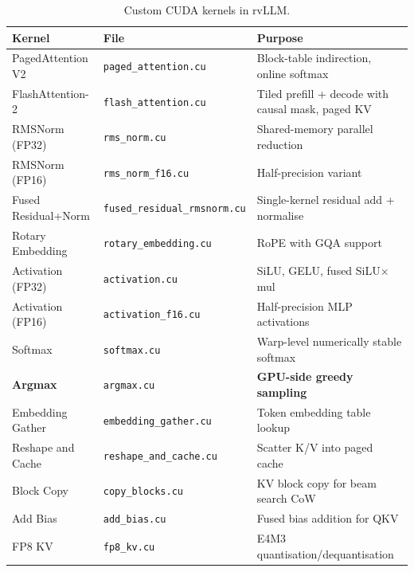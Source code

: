 \documentclass[11pt,a4paper]{article}
\newcommand{\thead}[1]{\textbf{\color{white}#1}}
\begin{document}
\begin{table}[t]
  \centering
  \caption{Custom CUDA kernels in rvLLM.}
  \label{tab:kernels}
  \small
  \begin{tabular}{@{}llp{4.8cm}@{}}
    \toprule
    \rowcolor{HeaderBlue} \thead{Kernel} & \thead{File} & \thead{Purpose} \\
    \midrule
    PagedAttention V2   & \texttt{paged\_attention.cu}         & Block-table indirection, online softmax \\
    \rowcolor{gray!8}
    FlashAttention-2    & \texttt{flash\_attention.cu}          & Tiled prefill + decode with causal mask, paged KV \\
    RMSNorm (FP32)      & \texttt{rms\_norm.cu}                & Shared-memory parallel reduction \\
    \rowcolor{gray!8}
    RMSNorm (FP16)      & \texttt{rms\_norm\_f16.cu}            & Half-precision variant \\
    Fused Residual+Norm  & \texttt{fused\_residual\_rmsnorm.cu}  & Single-kernel residual add + normalise \\
    \rowcolor{gray!8}
    Rotary Embedding     & \texttt{rotary\_embedding.cu}         & RoPE with GQA support \\
    Activation (FP32)    & \texttt{activation.cu}               & SiLU, GELU, fused SiLU$\times$mul \\
    \rowcolor{gray!8}
    Activation (FP16)    & \texttt{activation\_f16.cu}           & Half-precision MLP activations \\
    Softmax              & \texttt{softmax.cu}                  & Warp-level numerically stable softmax \\
    \rowcolor{gray!8}
    \textbf{Argmax}      & \texttt{argmax.cu}                   & \textbf{GPU-side greedy sampling} \\
    Embedding Gather     & \texttt{embedding\_gather.cu}         & Token embedding table lookup \\
    \rowcolor{gray!8}
    Reshape and Cache    & \texttt{reshape\_and\_cache.cu}       & Scatter K/V into paged cache \\
    Block Copy           & \texttt{copy\_blocks.cu}              & KV block copy for beam search CoW \\
    \rowcolor{gray!8}
    Add Bias             & \texttt{add\_bias.cu}                & Fused bias addition for QKV \\
    FP8 KV               & \texttt{fp8\_kv.cu}                  & E4M3 quantisation/dequantisation \\
    \bottomrule
  \end{tabular}
\end{table}
\end{document}
